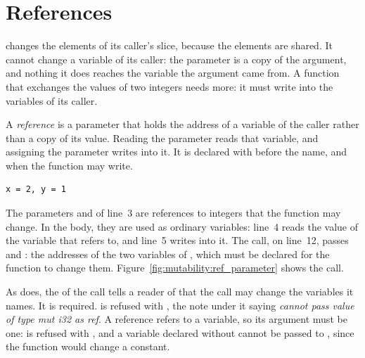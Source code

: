 \vfill\pagebreak
\section{References}
\label{sec:mutability:references}

 changes the elements of its caller's slice, because the
elements are shared. It cannot change a variable of its caller: the parameter
is a copy of the argument, and nothing it does reaches the variable the argument
came from. A function that exchanges the values of two integers needs more: it
must write into the variables of its caller.

A \textit{reference} is a parameter that holds the address of a variable of the
caller rather than a copy of its value. Reading the parameter reads that
variable, and assigning the parameter writes into it. It is declared with
 before the name, and  when the function may write.


\vspace{-10pt}%
\begin{lstlisting}[style=bashVerb]
x = 2, y = 1
\end{lstlisting}

The parameters  and  of line~3 are references to integers
that the function may change. In the body, they are used as ordinary variables:
line~4 reads the value of the variable that  refers to, and line~5
writes into it. The call, on line~12, passes  and :
the addresses of the two variables of , which must be declared
 for the function to change them.
Figure~\ref{fig:mutability:ref_parameter} shows the call.



As  does, the  of the call tells a reader of
 that the call may change the variables it names. It is required.
 is refused with , the note under it saying
\textit{cannot pass value of type mut i32 as ref}. A reference refers to a
variable, so its argument must be one:  is refused
with , and a variable declared without 
cannot be passed to , since the function would change a
constant.

